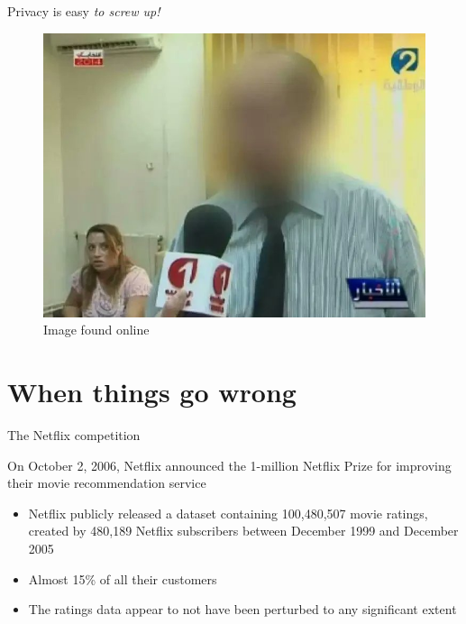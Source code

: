 \documentclass[12pt,aspectratio=169,handout]{beamer}
\begin{document}
\begin{frame}{Privacy is easy \emph{to screw up!}}
\begin{figure}
\includegraphics[width=0.70\linewidth]{img/Fyyh84VXoAQVau5}
\caption{Image found online}
\end{figure}
\end{frame}







\section{When things go wrong}

\begin{frame}{The Netflix competition}

On October 2, 2006, Netflix announced the 1-million Netflix Prize for improving their movie recommendation service


\begin{itemize}
\item  Netflix publicly released a dataset containing 100,480,507 movie ratings, created by 480,189 Netflix subscribers between December 1999 and December 2005
\item Almost 15\% of all their customers
\item The ratings data appear to not have been perturbed to any significant extent
\end{itemize}



\end{frame}
\end{document}
